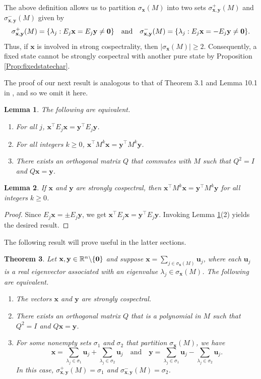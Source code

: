 \documentclass[11pt]{article}
\newtheorem{theorem}{Theorem}
\newtheorem{lemma}[theorem]{Lemma}
\newcommand{\zero}{{\bf{0}}}
\newcommand{\bx}{\mathbf x}
\newcommand{\by}{\mathbf y}
\newcommand{\bu}{\mathbf u}
\def\R{\mathbb{R}}
\begin{document}
The above definition allows us to partition $\sigma_{\bx}(M)$ into two sets $\sigma_{\bx,\by}^{+}(M)$ and $\sigma_{\bx,\by}^{-}(M)$ given by
\begin{equation*}
\sigma_{\bx,\by}^{+}(M)=\{\lambda_j:E_j\bx=E_j\by\neq \zero\}\quad \text{and} \quad \sigma_{\bx,\by}^{-}(M)=\{\lambda_j:E_j\bx=-E_j\by\neq \zero\}.
\end{equation*}
Thus, if $\bx$ is involved in strong cospectrality, then $|\sigma_{\bx}(M)|\geq 2$. Consequently, a fixed state cannot be strongly cospectral with another pure state by Proposition \ref{Prop:fixedstatechar}.

The proof of our next result is analogous to that of Theorem 3.1 and Lemma 10.1 in \cite{GodsilSmith2024}, and so we omit it here.

\begin{lemma}
\label{prop:}
The following are equivalent.
\begin{enumerate}
\item For all $j$, $\bx^\top E_j\bx=\by^\top E_j\by$.
\item For all integers $k\geq 0$, $\bx^\top M^k\bx=\by^\top M^k\by$.
\item There exists an orthogonal matrix $Q$ that commutes with $M$ such that $Q^2=I$ and $Q\bx=\by$.
\end{enumerate}
\end{lemma}

\begin{lemma}
\label{Prop:cosp}
If $\bx$ and $\by$ are strongly cospectral, then $\bx^\top M^k\bx=\by^\top M^k\by$ for all integers $k\geq 0$.
\end{lemma}

\begin{proof}
Since $E_j\bx=\pm E_j\by$, we get $\bx^\top E_j\bx=\by^\top E_j\by$. Invoking Lemma \ref{prop:}(2) yields the desired result.
\end{proof} 

The following result will prove useful in the latter sections.

\begin{theorem}
\label{Prop:sc}
Let $\bx,\by\in \R^n\backslash\{\zero\}$ and suppose
$\bx=\sum_{j\in \sigma_{\bx}(M)}\bu_j$, where each $\bu_j$ is a real eigenvector associated with an eigenvalue $\lambda_j\in \sigma_{\bx}(M)$. The following are equivalent.
\begin{enumerate}
\item The vectors $\bx$ and $\by$ are strongly cospectral.
\item There exists an orthogonal matrix $Q$ that is a polynomial in $M$ such that $Q^2=I$ and $Q\bx=\by$.
\item For some nonempty sets $\sigma_1$ and $\sigma_2$ that partition $\sigma_{\bx}(M)$, we have
\begin{equation*}
\bx=\sum_{\lambda_j\in \sigma_1}\bu_j+\sum_{\lambda_j\in \sigma_2}\bu_j\quad \text{and}\quad \by=\sum_{\lambda_j\in \sigma_1}\bu_j-\sum_{\lambda_j\in \sigma_2}\bu_j.
\end{equation*}
In this case, $\sigma_{\bx,\by}^{+}(M)=\sigma_1$ and $\sigma_{\bx,\by}^{-}(M)=\sigma_2$.
\end{enumerate}
\end{theorem}
\end{document}
